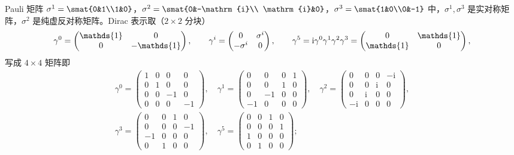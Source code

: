 \documentclass[UTF8,a4paper,11pt,fontset=fandol]{ctexart}
\let\amsmathbb\mathbb
\renewcommand{\mathbb}[1]{\ifx1#1\mathds{1}\else\amsmathbb{#1}\fi}
\theoremstyle{cplain}
\theoremstyle{cdefinition}
\theoremstyle{cremark}
\numberwithin{equation}{section}
\newcommand{\ii}{\mathrm{i}}                        %
\begin{document}
Pauli 矩阵 $\sigma^1=\smat{0&1\\1&0}$，$\sigma^2=\smat{0&-\ii\\ \ii&0}$，$\sigma^3=\smat{1&0\\0&-1}$ 中，$\sigma^1,\sigma^3$ 是实对称矩阵，$\sigma^2$ 是纯虚反对称矩阵。Dirac 表示取（$2\times2$ 分块）
\begin{equation}\label{eq:app-dirac-blocks}
\gamma^0=\begin{pmatrix}\mathbb 1&0\\0&-\mathbb 1\end{pmatrix},\qquad
\gamma^i=\begin{pmatrix}0&\sigma^i\\-\sigma^i&0\end{pmatrix},\qquad
\gamma^5=\ii\gamma^0\gamma^1\gamma^2\gamma^3=\begin{pmatrix}0&\mathbb 1\\ \mathbb 1&0\end{pmatrix},
\end{equation}
写成 $4\times4$ 矩阵即
\begin{equation}\label{eq:app-dirac-gammas}
\begin{gathered}
\gamma^0=\begin{pmatrix}1&0&0&0\\0&1&0&0\\0&0&-1&0\\0&0&0&-1\end{pmatrix},\quad
\gamma^1=\begin{pmatrix}0&0&0&1\\0&0&1&0\\0&-1&0&0\\-1&0&0&0\end{pmatrix},\quad
\gamma^2=\begin{pmatrix}0&0&0&-\ii\\0&0&\ii&0\\0&\ii&0&0\\-\ii&0&0&0\end{pmatrix},\\[4pt]
\gamma^3=\begin{pmatrix}0&0&1&0\\0&0&0&-1\\-1&0&0&0\\0&1&0&0\end{pmatrix},\quad
\gamma^5=\begin{pmatrix}0&0&1&0\\0&0&0&1\\1&0&0&0\\0&1&0&0\end{pmatrix};
\end{gathered}
\end{equation}
\end{document}
